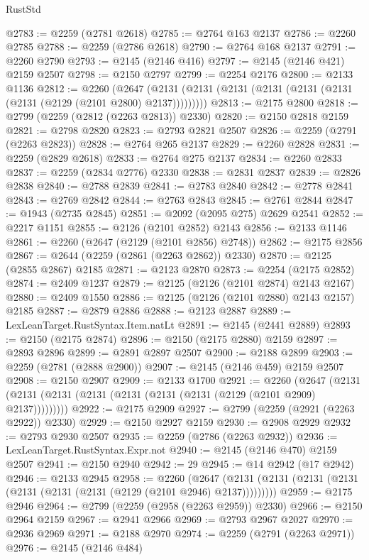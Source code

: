 \begin{lexlean}{RustStd}
\begin{coremodule}
@2783 := @2259 (@2781 @2618)
@2785 := @2764 @163 @2137
@2786 := @2260 @2785
@2788 := @2259 (@2786 @2618)
@2790 := @2764 @168 @2137
@2791 := @2260 @2790
@2793 := @2145 (@2146 @416)
@2797 := @2145 (@2146 @421) @2159 @2507
@2798 := @2150 @2797
@2799 := @2254 @2176
@2800 := @2133 @1136
@2812 := @2260
    (@2647 (@2131 (@2131 (@2131 (@2131 (@2131 (@2131 (@2131 (@2129 (@2101 @2800) @2137)))))))))
@2813 := @2175 @2800
@2818 := @2799 (@2259 (@2812 (@2263 @2813)) @2330)
@2820 := @2150 @2818 @2159
@2821 := @2798 @2820
@2823 := @2793 @2821 @2507
@2826 := @2259 (@2791 (@2263 @2823))
@2828 := @2764 @265 @2137
@2829 := @2260 @2828
@2831 := @2259 (@2829 @2618)
@2833 := @2764 @275 @2137
@2834 := @2260 @2833
@2837 := @2259 (@2834 @2776) @2330
@2838 := @2831 @2837
@2839 := @2826 @2838
@2840 := @2788 @2839
@2841 := @2783 @2840
@2842 := @2778 @2841
@2843 := @2769 @2842
@2844 := @2763 @2843
@2845 := @2761 @2844
@2847 := @1943 (@2735 @2845)
@2851 := @2092 (@2095 @275) @2629 @2541
@2852 := @2217 @1151
@2855 := @2126 (@2101 @2852) @2143
@2856 := @2133 @1146
@2861 := @2260 (@2647 (@2129 (@2101 @2856) @2748))
@2862 := @2175 @2856
@2867 := @2644 (@2259 (@2861 (@2263 @2862)) @2330)
@2870 := @2125 (@2855 @2867) @2185
@2871 := @2123 @2870
@2873 := @2254 (@2175 @2852)
@2874 := @2409 @1237
@2879 := @2125 (@2126 (@2101 @2874) @2143 @2167)
@2880 := @2409 @1550
@2886 := @2125 (@2126 (@2101 @2880) @2143 @2157) @2185
@2887 := @2879 @2886
@2888 := @2123 @2887
@2889 := LexLeanTarget.RustSyntax.Item.natLt
@2891 := @2145 (@2441 @2889)
@2893 := @2150 (@2175 @2874)
@2896 := @2150 (@2175 @2880) @2159
@2897 := @2893 @2896
@2899 := @2891 @2897 @2507
@2900 := @2188 @2899
@2903 := @2259 (@2781 (@2888 @2900))
@2907 := @2145 (@2146 @459) @2159 @2507
@2908 := @2150 @2907
@2909 := @2133 @1700
@2921 := @2260
    (@2647 (@2131 (@2131 (@2131 (@2131 (@2131 (@2131 (@2131 (@2129 (@2101 @2909) @2137)))))))))
@2922 := @2175 @2909
@2927 := @2799 (@2259 (@2921 (@2263 @2922)) @2330)
@2929 := @2150 @2927 @2159
@2930 := @2908 @2929
@2932 := @2793 @2930 @2507
@2935 := @2259 (@2786 (@2263 @2932))
@2936 := LexLeanTarget.RustSyntax.Expr.not
@2940 := @2145 (@2146 @470) @2159 @2507
@2941 := @2150 @2940
@2942 := 29
@2945 := @14 @2942 (@17 @2942)
@2946 := @2133 @2945
@2958 := @2260
    (@2647 (@2131 (@2131 (@2131 (@2131 (@2131 (@2131 (@2131 (@2129 (@2101 @2946) @2137)))))))))
@2959 := @2175 @2946
@2964 := @2799 (@2259 (@2958 (@2263 @2959)) @2330)
@2966 := @2150 @2964 @2159
@2967 := @2941 @2966
@2969 := @2793 @2967 @2027
@2970 := @2936 @2969
@2971 := @2188 @2970
@2974 := @2259 (@2791 (@2263 @2971))
@2976 := @2145 (@2146 @484)

\end{coremodule}
\end{lexlean}
